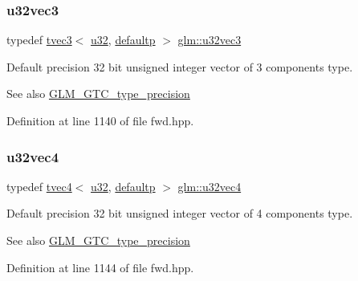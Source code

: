\subsubsection{\texorpdfstring{u32vec3}{u32vec3}}
{\footnotesize\ttfamily typedef \mbox{\hyperlink{structglm_1_1tvec3}{tvec3}}$<$ \mbox{\hyperlink{group__gtc__type__precision_ga54e837745059fd29017bed71cfa0a8db}{u32}}, \mbox{\hyperlink{namespaceglm_a0f04f086094c747d227af4425893f545a9d21ccd8b5a009ec7eb7677befc3bf51}{defaultp}} $>$ \mbox{\hyperlink{group__gtc__type__precision_ga16b26751ba6b83c8a0226b9834d73fdc}{glm\+::u32vec3}}}

Default precision 32 bit unsigned integer vector of 3 components type. \begin{DoxySeeAlso}{See also}
\mbox{\hyperlink{group__gtc__type__precision}{G\+L\+M\+\_\+\+G\+T\+C\+\_\+type\+\_\+precision}} 
\end{DoxySeeAlso}


Definition at line 1140 of file fwd.\+hpp.

\mbox{\label{group__gtc__type__precision_ga6e966cda0025699449a36b41f1787927}} 
\subsubsection{\texorpdfstring{u32vec4}{u32vec4}}
{\footnotesize\ttfamily typedef \mbox{\hyperlink{structglm_1_1tvec4}{tvec4}}$<$ \mbox{\hyperlink{group__gtc__type__precision_ga54e837745059fd29017bed71cfa0a8db}{u32}}, \mbox{\hyperlink{namespaceglm_a0f04f086094c747d227af4425893f545a9d21ccd8b5a009ec7eb7677befc3bf51}{defaultp}} $>$ \mbox{\hyperlink{group__gtc__type__precision_ga6e966cda0025699449a36b41f1787927}{glm\+::u32vec4}}}

Default precision 32 bit unsigned integer vector of 4 components type. \begin{DoxySeeAlso}{See also}
\mbox{\hyperlink{group__gtc__type__precision}{G\+L\+M\+\_\+\+G\+T\+C\+\_\+type\+\_\+precision}} 
\end{DoxySeeAlso}


Definition at line 1144 of file fwd.\+hpp.

\mbox{\label{group__gtc__type__precision_ga71cedd4972f9cb1a5e14dfe5ab83ecd7}} 
